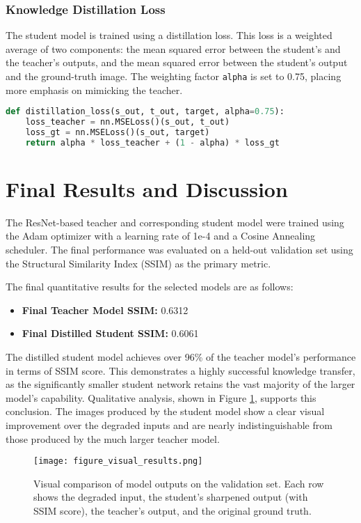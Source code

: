 \documentclass[12pt,a4paper]{article}
\begin{document}
\subsubsection{Knowledge Distillation Loss}
The student model is trained using a distillation loss. This loss is a weighted average of two components: the mean squared error between the student's and the teacher's outputs, and the mean squared error between the student's output and the ground-truth image. The weighting factor \texttt{alpha} is set to 0.75, placing more emphasis on mimicking the teacher.
\begin{lstlisting}[language=Python, caption={Knowledge Distillation Loss Function}]
def distillation_loss(s_out, t_out, target, alpha=0.75):
    loss_teacher = nn.MSELoss()(s_out, t_out)
    loss_gt = nn.MSELoss()(s_out, target)
    return alpha * loss_teacher + (1 - alpha) * loss_gt
\end{lstlisting}


\newpage
\section{Final Results and Discussion}
The ResNet-based teacher and corresponding student model were trained using the Adam optimizer with a learning rate of 1e-4 and a Cosine Annealing scheduler. The final performance was evaluated on a held-out validation set using the Structural Similarity Index (SSIM) as the primary metric.

The final quantitative results for the selected models are as follows:
\begin{itemize}
    \item \textbf{Final Teacher Model SSIM:} 0.6312
    \item \textbf{Final Distilled Student SSIM:} 0.6061
\end{itemize}

The distilled student model achieves over 96\% of the teacher model's performance in terms of SSIM score. This demonstrates a highly successful knowledge transfer, as the significantly smaller student network retains the vast majority of the larger model's capability. Qualitative analysis, shown in Figure \ref{fig:visual_results}, supports this conclusion. The images produced by the student model show a clear visual improvement over the degraded inputs and are nearly indistinguishable from those produced by the much larger teacher model.

\begin{figure}[htbp]
    \centering
    \texttt{[image: figure\_visual\_results.png]}
    \caption{Visual comparison of model outputs on the validation set. Each row shows the degraded input, the student's sharpened output (with SSIM score), the teacher's output, and the original ground truth.}
    \label{fig:visual_results}
\end{figure}
\end{document}
